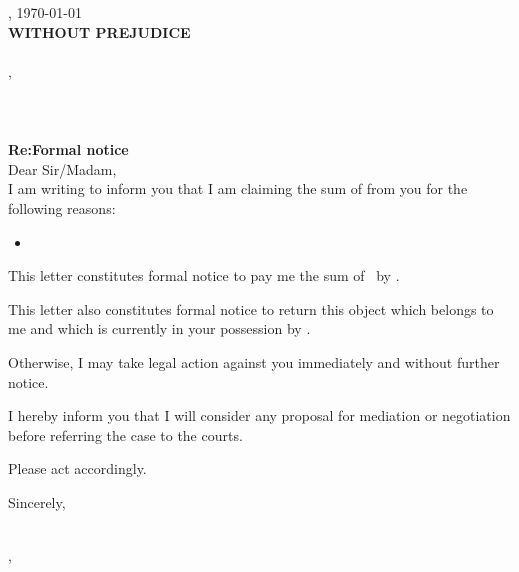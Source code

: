 
\noindent \AuthorPlace, \today\\[2em]
\noindent \textbf{WITHOUT PREJUDICE}\\[2em]
\noindent \ModeOfSending\\[2em]
\noindent \RecipientName, \RecipientTitle\\
\noindent \RecipientCompany\\
\noindent \RecipientAddressLineOne\\
\noindent \RecipientAddressLineTwo\\[2em]
\noindent \textbf{Re:\quad Formal notice}\\[1em]

Dear Sir/Madam,\\[1em]

I am writing to inform you that I am claiming the sum of \textbf{\AmountOwed} from you for the following reasons:

\begin{itemize}
    \item \IssueDescription
\end{itemize}

This letter constitutes formal notice to pay me the sum of \AmountOwed\ by \textbf{\Deadline}.

This letter also constitutes formal notice to return this object which belongs to me and which is currently in your possession by \textbf{\Deadline}.

Otherwise, I may take legal action against you immediately and without further notice.

I hereby inform you that I will consider any proposal for mediation or negotiation before referring the case to the courts.

Please act accordingly.

\vspace{2em}
Sincerely, \vspace{3em}

\AuthorName\\
\AuthorAddressLineOne, \AuthorAddressLineTwo\\
\AuthorPhone